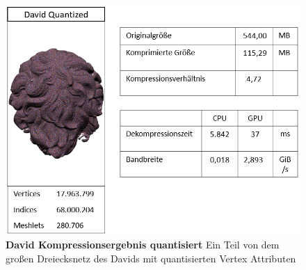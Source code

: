 \begin{figure}[htb]
  \centering  
  \includegraphics[scale=0.75]{Bilder/ergebnisse/david_q.png}
  \caption[David Kompressionsergebnis quantisiert]{\textbf{David Kompressionsergebnis quantisiert} Ein Teil von dem großen Dreiecksnetz des Davids mit quantisierten Vertex Attributen }
  \label{fig:david_ergebnis}
\end{figure}
